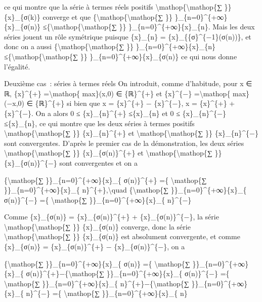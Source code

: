 \documentclass[]{article}
\begin{document}
ce qui montre que la série à termes réels positifs
\textbackslash{}mathop\{\textbackslash{}mathop\{∑ \}\} \{x\}\_\{σ(k)\}
converge et que \{\textbackslash{}mathop\{\textbackslash{}mathop\{∑ \}\}
\}\_\{n=0\}\^{}\{+∞\}\{x\}\_\{σ(n)\}
≤\{\textbackslash{}mathop\{\textbackslash{}mathop\{∑ \}\}
\}\_\{n=0\}\^{}\{+∞\}\{x\}\_\{n\}. Mais les deux séries jouent un rôle
symétrique puisque \{x\}\_\{n\} = \{x\}\_\{\{σ\}\^{}\{−1\}(σ(n))\}, et
donc on a aussi \{\textbackslash{}mathop\{\textbackslash{}mathop\{∑ \}\}
\}\_\{n=0\}\^{}\{+∞\}\{x\}\_\{n\}
≤\{\textbackslash{}mathop\{\textbackslash{}mathop\{∑ \}\}
\}\_\{n=0\}\^{}\{+∞\}\{x\}\_\{σ(n)\} ce qui nous donne l'égalité.

Deuxième cas~: séries à termes réels On introduit, comme d'habitude,
pour x ∈ ℝ, \{x\}\^{}\{+\} =\textbackslash{}mathop\{ max\}(x,0) ∈
\{ℝ\}\^{}\{+\} et \{x\}\^{}\{−\} =\textbackslash{}mathop\{ max\}(−x,0) ∈
\{ℝ\}\^{}\{+\} si bien que x = \{x\}\^{}\{+\} − \{x\}\^{}\{−\},
\textbar{}x\textbar{} = \{x\}\^{}\{+\} + \{x\}\^{}\{−\}. On a alors 0 ≤
\{x\}\_\{n\}\^{}\{+\} ≤\textbar{}\{x\}\_\{n\}\textbar{} et 0 ≤
\{x\}\_\{n\}\^{}\{−\}≤\textbar{}\{x\}\_\{n\}\textbar{}, ce qui montre
que les deux séries à termes positifs
\textbackslash{}mathop\{\textbackslash{}mathop\{∑ \}\}
\{x\}\_\{n\}\^{}\{+\} et
\textbackslash{}mathop\{\textbackslash{}mathop\{∑ \}\}
\{x\}\_\{n\}\^{}\{−\} sont convergentes. D'après le premier cas de la
démonstration, les deux séries
\textbackslash{}mathop\{\textbackslash{}mathop\{∑ \}\}
\{x\}\_\{σ(n)\}\^{}\{+\} et
\textbackslash{}mathop\{\textbackslash{}mathop\{∑ \}\}
\{x\}\_\{σ(n)\}\^{}\{−\} sont convergentes et on a

\{\textbackslash{}mathop\{∑ \}\}\_\{n=0\}\^{}\{+∞\}\{x\}\_\{
σ(n)\}\^{}\{+\} =\{ \textbackslash{}mathop\{∑
\}\}\_\{n=0\}\^{}\{+∞\}\{x\}\_\{ n\}\^{}\{+\},\textbackslash{}quad
\{\textbackslash{}mathop\{∑ \}\}\_\{n=0\}\^{}\{+∞\}\{x\}\_\{
σ(n)\}\^{}\{−\} =\{ \textbackslash{}mathop\{∑
\}\}\_\{n=0\}\^{}\{+∞\}\{x\}\_\{ n\}\^{}\{−\}

Comme \textbar{}\{x\}\_\{σ(n)\}\textbar{} = \{x\}\_\{σ(n)\}\^{}\{+\} +
\{x\}\_\{σ(n)\}\^{}\{−\}, la série
\textbackslash{}mathop\{\textbackslash{}mathop\{∑ \}\}
\textbar{}\{x\}\_\{σ(n)\}\textbar{} converge, donc la série
\textbackslash{}mathop\{\textbackslash{}mathop\{∑ \}\} \{x\}\_\{σ(n)\}
est absolument convergente, et comme \{x\}\_\{σ(n)\} =
\{x\}\_\{σ(n)\}\^{}\{+\} − \{x\}\_\{σ(n)\}\^{}\{−\}, on a

\{\textbackslash{}mathop\{∑ \}\}\_\{n=0\}\^{}\{+∞\}\{x\}\_\{ σ(n)\} =\{
\textbackslash{}mathop\{∑ \}\}\_\{n=0\}\^{}\{+∞\}\{x\}\_\{
σ(n)\}\^{}\{+\}−\{\textbackslash{}mathop\{∑
\}\}\_\{n=0\}\^{}\{+∞\}\{x\}\_\{ σ(n)\}\^{}\{−\} =\{
\textbackslash{}mathop\{∑ \}\}\_\{n=0\}\^{}\{+∞\}\{x\}\_\{
n\}\^{}\{+\}−\{\textbackslash{}mathop\{∑
\}\}\_\{n=0\}\^{}\{+∞\}\{x\}\_\{ n\}\^{}\{−\} =\{
\textbackslash{}mathop\{∑ \}\}\_\{n=0\}\^{}\{+∞\}\{x\}\_\{ n\}
\end{document}

